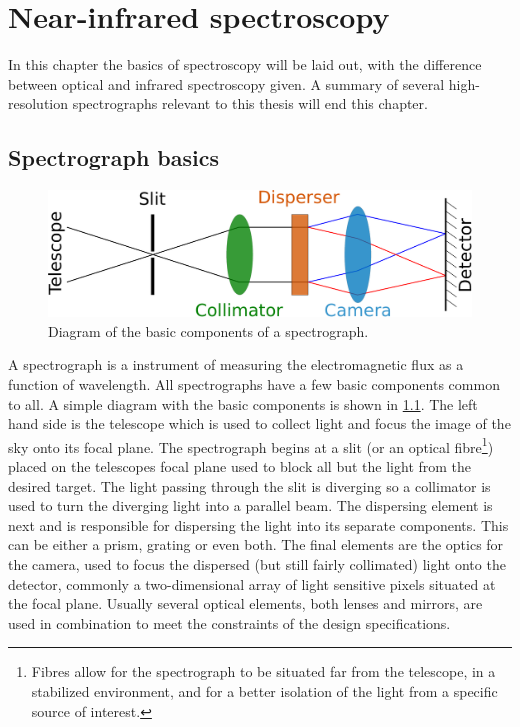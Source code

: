 
\chapter{Near-infrared spectroscopy}
\label{cha:nir_spectroscopy}
In this chapter the basics of spectroscopy will be laid out, with the difference between optical and infrared spectroscopy given.
A summary of several high-resolution \nir{} spectrographs relevant to this thesis will end this chapter.

\section{Spectrograph basics}
\label{sec:spectroscopy_basics}
\begin{figure}
    \centering
    \includegraphics[width=0.7\linewidth]{figures/spectroscopy/spectrograph_elements}
    \caption[Basic components of a spectrograph.]{Diagram of the basic components of a spectrograph.}
    \label{fig:spectrograph_elements}
\end{figure}
A spectrograph is a instrument of measuring the electromagnetic flux as a function of wavelength.
All spectrographs have a few basic components common to all.
A simple diagram with the basic components is shown in \cref{fig:spectrograph_elements}.
The left hand side is the telescope which is used to collect light and focus the image of the sky onto its focal plane.
The spectrograph begins at a slit (or an optical fibre\footnote{Fibres allow for the spectrograph to be situated far from the telescope, in a stabilized environment, and for a better isolation of the light from a specific source of interest.}) placed on the telescopes focal plane used to block all but the light from the desired target.
The light passing through the slit is diverging so a collimator is used to turn the diverging light into a parallel beam.
The dispersing element is next and is responsible for dispersing the light into its separate components.
This can be either a prism, grating or even both.
The final elements are the optics for the camera, used to focus the dispersed (but still fairly collimated) light onto the detector, commonly a two-dimensional array of light sensitive pixels situated at the focal plane.
Usually several optical elements, both lenses and mirrors, are used in combination to meet the constraints of the design specifications.


